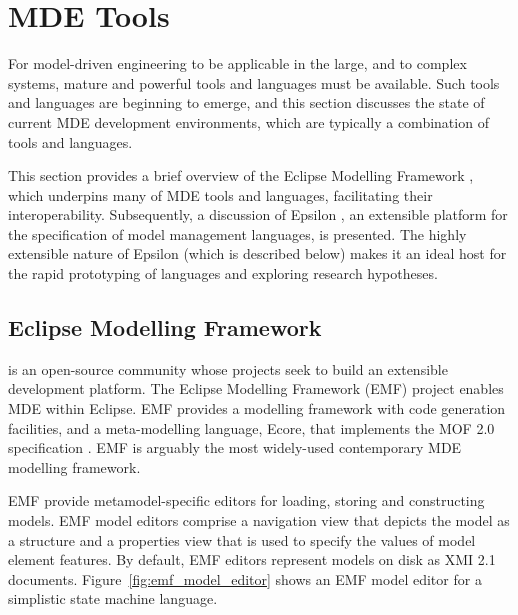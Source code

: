 
\section{MDE Tools}
\label{sec:mde_tools}
For model-driven engineering to be applicable in the large, and to complex systems, mature and powerful tools and languages must be available. Such tools and languages are beginning to emerge, and this section discusses the state of current MDE development environments, which are typically a combination of tools and languages.


This section provides a brief overview of the Eclipse Modelling Framework \cite{emf}, which underpins many of MDE tools and languages, facilitating their interoperability. Subsequently, a discussion of Epsilon \cite{epsilon}, an extensible platform for the specification of model management languages, is presented. The highly extensible nature of Epsilon (which is described below) makes it an ideal host for the rapid prototyping of languages and exploring research hypotheses.  

\subsection{Eclipse Modelling Framework}
\label{subsec:emf}
\cite{eclipse} is an open-source community whose projects seek to build an extensible development platform. The Eclipse Modelling Framework (EMF) project \cite{emf} enables MDE within Eclipse. EMF provides a modelling framework with code generation facilities, and a meta-modelling language, Ecore, that implements the MOF 2.0 specification \cite{mof}. EMF is arguably the most widely-used contemporary MDE modelling framework.

EMF provide metamodel-specific editors for loading, storing and constructing models. EMF model editors comprise a navigation view that depicts the model as a structure and a properties view that is used to specify the values of model element features. By default, EMF editors represent models on disk as XMI 2.1 \cite{xmi} documents.  Figure~\ref{fig:emf_model_editor} shows an EMF model editor for a simplistic state machine language. 

